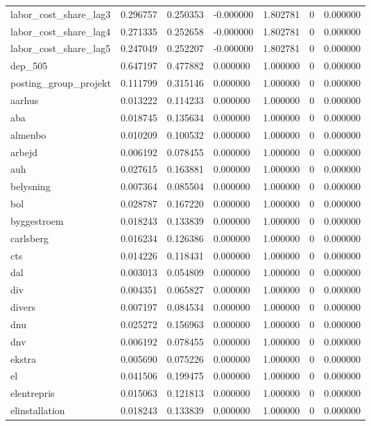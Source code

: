 \begin{landscape}
\begin{longtable}[h!]{lrrllrr}
labor_cost_share_lag3 & 0.296757 & 0.250353 & -0.000000 & 1.802781 & 0 & 0.000000 \\
labor_cost_share_lag4 & 0.271335 & 0.252658 & -0.000000 & 1.802781 & 0 & 0.000000 \\
labor_cost_share_lag5 & 0.247049 & 0.252207 & -0.000000 & 1.802781 & 0 & 0.000000 \\
dep_505 & 0.647197 & 0.477882 & 0.000000 & 1.000000 & 0 & 0.000000 \\
posting_group_projekt & 0.111799 & 0.315146 & 0.000000 & 1.000000 & 0 & 0.000000 \\
aarhus & 0.013222 & 0.114233 & 0.000000 & 1.000000 & 0 & 0.000000 \\
aba & 0.018745 & 0.135634 & 0.000000 & 1.000000 & 0 & 0.000000 \\
almenbo & 0.010209 & 0.100532 & 0.000000 & 1.000000 & 0 & 0.000000 \\
arbejd & 0.006192 & 0.078455 & 0.000000 & 1.000000 & 0 & 0.000000 \\
auh & 0.027615 & 0.163881 & 0.000000 & 1.000000 & 0 & 0.000000 \\
belysning & 0.007364 & 0.085504 & 0.000000 & 1.000000 & 0 & 0.000000 \\
bol & 0.028787 & 0.167220 & 0.000000 & 1.000000 & 0 & 0.000000 \\
byggestroem & 0.018243 & 0.133839 & 0.000000 & 1.000000 & 0 & 0.000000 \\
carlsberg & 0.016234 & 0.126386 & 0.000000 & 1.000000 & 0 & 0.000000 \\
cts & 0.014226 & 0.118431 & 0.000000 & 1.000000 & 0 & 0.000000 \\
dal & 0.003013 & 0.054809 & 0.000000 & 1.000000 & 0 & 0.000000 \\
div & 0.004351 & 0.065827 & 0.000000 & 1.000000 & 0 & 0.000000 \\
divers & 0.007197 & 0.084534 & 0.000000 & 1.000000 & 0 & 0.000000 \\
dnu & 0.025272 & 0.156963 & 0.000000 & 1.000000 & 0 & 0.000000 \\
dnv & 0.006192 & 0.078455 & 0.000000 & 1.000000 & 0 & 0.000000 \\
ekstra & 0.005690 & 0.075226 & 0.000000 & 1.000000 & 0 & 0.000000 \\
el & 0.041506 & 0.199475 & 0.000000 & 1.000000 & 0 & 0.000000 \\
elentrepris & 0.015063 & 0.121813 & 0.000000 & 1.000000 & 0 & 0.000000 \\
elinstallation & 0.018243 & 0.133839 & 0.000000 & 1.000000 & 0 & 0.000000 \\

\end{longtable}
\end{landscape}

